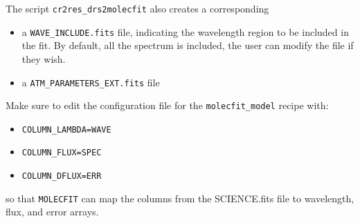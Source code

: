 The script \verb!cr2res_drs2molecfit! also creates a corresponding 
\begin{itemize}
  \item a \verb!WAVE_INCLUDE.fits! file, indicating the wavelength
region to be included in the fit. By default, all the spectrum is included, the user can modify the file if they wish.
  \item a  \verb!ATM_PARAMETERS_EXT.fits! file
\end{itemize}

Make sure to edit the configuration file for the \verb!molecfit_model! recipe with:
\begin{itemize}
 \item \verb!COLUMN_LAMBDA=WAVE!
 \item \verb!COLUMN_FLUX=SPEC!
 \item \verb!COLUMN_DFLUX=ERR!
\end{itemize}
so that {\tt MOLECFIT} can map the columns from the SCIENCE.fits file to wavelength, flux, and error arrays.
